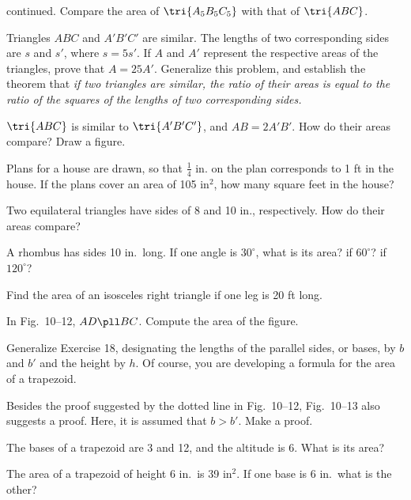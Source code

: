 \documentclass[11pt]{book}
\theoremstyle{bkplain}
\theoremstyle{XIplainnote}
\theoremstyle{bkplain}
\theoremstyle{bkplain}
\begin{document}
\begin{exercisecols}
\begin{exlist}
  continued. Compare the area of $\tri{A_5B_5C_5}$ with that of $\tri{ABC}$.
\item[\stex 12.] Triangles $ABC$ and $A'B'C'$ are similar. The lengths of two
  corresponding sides are $s$ and $s'$, where $s = 5s'$. If $A$ and $A'$
  represent the respective areas of the triangles, prove that $A = 25A'$.
  Generalize this problem, and establish the theorem that \emph{if two
  triangles are similar, the ratio of their areas is equal to the ratio of the
  squares of the lengths of two corresponding sides.}
\item[13.] $\tri{ABC}$ is similar to $\tri{A'B'C'}$, and $AB = 2A'B'$. How do
  their areas compare? Draw a figure.
\item[\stex 14.] Plans for a house are drawn, so that $\frac{1}{4}$ in. on the
  plan corresponds to 1 ft in the house. If the plans cover an area of
  105 in$^2$, how many square feet in the house?
\item[15.] Two equilateral triangles have sides of 8 and 10 in.,
  respectively. How do their areas compare?
\item[16.] A rhombus has sides 10 in.\ long. If one angle is $30^\circ$, what
  is its area? if $60^\circ$? if $120^\circ$?
\item[17.] Find the area of an isosceles right triangle if one leg is 20 ft
  long.
\item[18.] In Fig.~10--12, $AD \pll BC$. Compute the area of the figure.
\exfig{\FIGXTWELVE}
\item[\stex 19.] Generalize Exercise 18, designating the lengths of the
  parallel sides, or bases, by $b$ and $b'$ and the height by $h$. Of course,
  you are developing a formula for the area of a trapezoid.
\item[20.] Besides the proof suggested by the dotted line in Fig.~10--12,
  Fig.~10--13 also suggests a proof. Here, it is assumed that $b > b'$. Make a
  proof.
\exfig{\FIGXTHIRTEEN}
\setcounter{exlisti}{20}
\item The bases of a trapezoid are 3 and 12, and the altitude is 6. What is
  its area?
\item The area of a trapezoid of height 6 in.\ is 39 in$^2$. If one base is
  6 in.\ what is the other?

\end{exlist}
\end{exercisecols}
\end{document}
